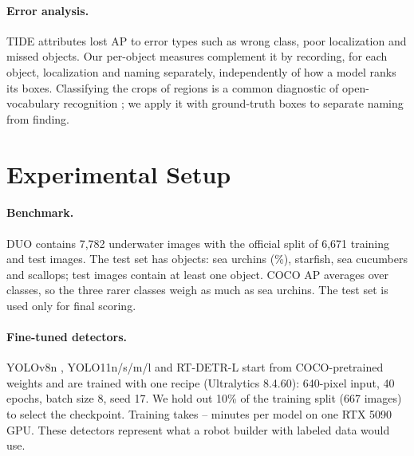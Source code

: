 \documentclass[letterpaper]{article} %
\begin{document}
\paragraph{Error analysis.}
TIDE \citep{bolya2020tide} attributes lost AP to error types such as wrong class, poor localization and missed objects. Our per-object measures complement it by recording, for each object, localization and naming separately, independently of how a model ranks its boxes. Classifying the crops of regions is a common diagnostic of open-vocabulary recognition \citep{gu2022vild}; we apply it with ground-truth boxes to separate naming from finding.



\section{Experimental Setup}
\label{sec:setup}

\paragraph{Benchmark.}
DUO \citep{liu2021duo} contains 7,782 underwater images with the official split of 6,671 training and \nTestImages{} test images. The test set has \nTestObjects{} objects: \nSeaUrchin{} sea urchins (\shareSeaUrchin\%), \nStarfish{} starfish, \nSeaCucumber{} sea cucumbers and \nScallop{} scallops; \nImagesWithObjects{} test images contain at least one object. COCO AP averages over classes, so the three rarer classes weigh as much as sea urchins. The test set is used only for final scoring.

\paragraph{Fine-tuned detectors.}
YOLOv8n \citep{jocher2023yolov8}, YOLO11n/s/m/l \citep{jocher2024yolo11} and RT-DETR-L \citep{zhao2024rtdetr} start from COCO-pretrained weights and are trained with one recipe (Ultralytics 8.4.60): 640-pixel input, 40 epochs, batch size 8, seed 17. We hold out 10\% of the training split (667 images) to select the checkpoint. Training takes \trainMinMinutes--\trainMaxMinutes{} minutes per model on one RTX 5090 GPU. These detectors represent what a robot builder with labeled data would use.
\end{document}
